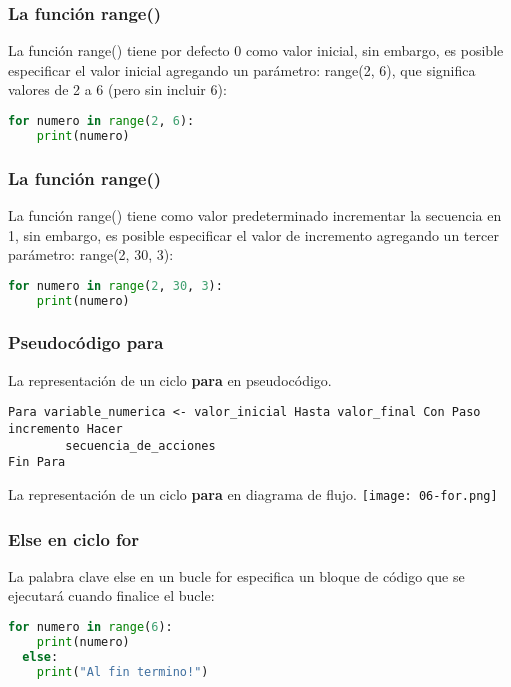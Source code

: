 \begin{frame}[fragile]
  \frametitle{La función \textbf{range}()}

  La función \textcolor{codeKeyword2}{range}() tiene por defecto 0
  como valor inicial, sin embargo, es posible especificar el valor
  inicial agregando un parámetro: \textcolor{codeKeyword2}{range}(2, 6),
  que significa valores de 2 a 6 (pero sin incluir 6):

  \vspace{\baselineskip}
  \begin{lstlisting}[language=Python]
  for numero in range(2, 6):
    print(numero)
  \end{lstlisting}
\end{frame}

\begin{frame}[fragile]
  \frametitle{La función \textbf{range}()}

  La función \textcolor{codeKeyword2}{range}() tiene como valor
  predeterminado incrementar la secuencia en 1, sin embargo, es
  posible especificar el valor de incremento agregando un tercer
  parámetro: \textcolor{codeKeyword2}{range}(2, 30, 3):

  \vspace{\baselineskip}
  \begin{lstlisting}[language=Python]
  for numero in range(2, 30, 3):
    print(numero)
  \end{lstlisting}
\end{frame}

\begin{frame}[fragile]
  \frametitle{Pseudocódigo \textbf{para}}
  La representación de un ciclo \textbf{para} en pseudocódigo.
  \begin{lstlisting}[style=pseudocodigo]
Para variable_numerica <- valor_inicial Hasta valor_final Con Paso incremento Hacer
		secuencia_de_acciones
Fin Para
  \end{lstlisting}

  La representación de un ciclo \textbf{para} en diagrama de flujo.
  \texttt{[image: 06-for.png]}
\end{frame}


\begin{frame}[fragile]
  \frametitle{\textbf{Else} en ciclo \textbf{for}}

  La palabra clave \textcolor{codeKeyword2}{else} en un bucle for
  especifica un bloque de código que se ejecutará cuando
  finalice el bucle:

  \vspace{\baselineskip}
  \begin{lstlisting}[language=Python]
  for numero in range(6):
    print(numero)
  else:
    print("Al fin termino!")
  \end{lstlisting}
\end{frame}

